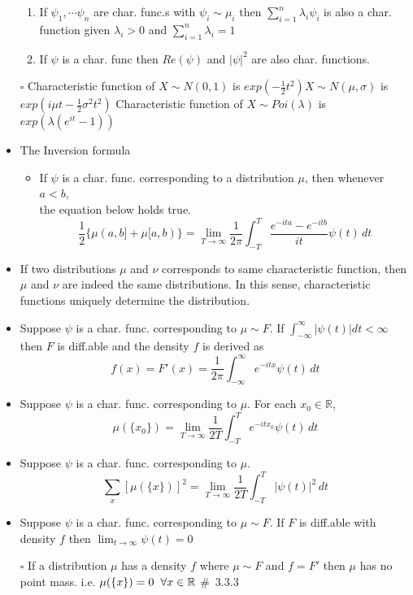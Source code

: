 \documentclass[12pt, A4]{article}
\begin{document}
\begin{itemize}
\begin{enumerate}
		\item If $\psi_1, \cdots \psi_n$ are char. func.s with $\psi_i \sim \mu_i$ then $\sum_{i=1}^{n}\lambda_i\psi_i$ is also a char. function given $\lambda_i>0$ and $\sum_{i=1}^{n}\lambda_i=1$
		\item If $\psi$ is a char. func then $Re(\psi)$ and $|\psi|^2$ are also char. functions.
	\end{enumerate}
	\item[$\square$] Characteristic function of $X\sim N(0,1)$ is $exp(-\frac{1}{2}t^2)$\quad  $X\sim N(\mu, \sigma)$ is $exp(i\mu t-\frac{1}{2}\sigma^2 t^2)$
	\newline Characteristic function of $X\sim Poi(\lambda)$ is $exp(\lambda(e^{it}-1))$
	\item The Inversion formula
	\begin{itemize}
		\item If $\psi$ is a char. func. corresponding to a distribution $\mu$, then whenever $a<b$,\\ the equation below holds true. 
		\[\frac{1}{2}\{\mu(a,b]+\mu[a,b)\}=\lim_{T \to \infty}\frac{1}{2\pi}\int_{-T}^{T} \frac{e^{-ita}-e^{-itb}}{it}\psi(t)\,dt \]
	\end{itemize}
	\item If two distributions $\mu$ and $\nu$ corresponds to same characteristic function, then $\mu$ and $\nu$ are indeed the same distributions. In this sense, characteristic functions uniquely determine the distribution.
	\item Suppose $\psi$ is a char. func. corresponding to $\mu\sim F$. \newline If $\int_{-\infty}^{\infty}|\psi(t)|dt<\infty$ then $F$ is diff.able and the density $f$ is derived as \[f(x)=F'(x)=\frac{1}{2\pi}\int_{-\infty}^{\infty}e^{-itx}\psi(t)\,dt\]
	\item Suppose $\psi$ is a char. func. corresponding to $\mu$. For each $x_0\in \mathbb{R}$, $$\mu(\{x_0\})=\lim_{T \to \infty}\frac{1}{2T}\int_{-T}^{T}e^{-itx_0}\psi(t)\,dt$$
	\item Suppose $\psi$ is a char. func. corresponding to $\mu$.
	$$\sum_{x}{[\mu(\{x\})]^2}=\lim_{T \to \infty}\frac{1}{2T}\int_{-T}^{T}|\psi(t)|^2\,dt$$
	\item Suppose $\psi$ is a char. func. corresponding to $\mu\sim F$. If $F$ is diff.able with density $f$ then $\lim_{t \to \infty} \psi(t)=0$
	\item[$\square$] If a distribution $\mu$ has a density $f$ where $\mu\sim F$ and $f=F'$ then $\mu$ has no point mass. i.e.\hspace{0.2cm} $\mu(\{x\})=0 \hspace{0.2cm} \forall x\in \mathbb{R}$ \quad \#\ 3.3.3

\end{itemize}
\end{document}
